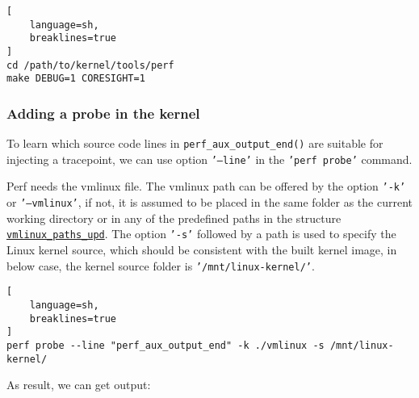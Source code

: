 \documentclass[11pt]{diazessay} %
\def\code#1{\texttt{#1}}
\begin{document}
\begin{lstlisting}[
  	language=sh,
	breaklines=true
]
cd /path/to/kernel/tools/perf
make DEBUG=1 CORESIGHT=1
\end{lstlisting}

\subsubsection*{Adding a probe in the kernel}

To learn which source code lines in \code{perf\_aux\_output\_end()} are
suitable for injecting a tracepoint, we can use option \code{'---line'} in the
\code{'perf probe'} command.

Perf needs the vmlinux file. The vmlinux path can be offered by the option
\code{'-k'} or \code{'---vmlinux'}, if not, it is assumed to be placed in the
same folder as the current working directory or in any of the predefined paths
in the structure
\href{https://git.kernel.org/pub/scm/linux/kernel/git/torvalds/linux.git/tree/tools/perf/util/symbol.c?h=v6.8-rc1#n2246}{\code{vmlinux\_paths\_upd}}.
The option \code{'-s'} followed by a path is used to specify the Linux kernel
source, which should be consistent with the built kernel image, in below case,
the kernel source folder is \code{'/mnt/linux-kernel/'}.

\begin{lstlisting}[
  	language=sh,
	breaklines=true
]
perf probe --line "perf_aux_output_end" -k ./vmlinux -s /mnt/linux-kernel/
\end{lstlisting}

As result, we can get output:
\end{document}
